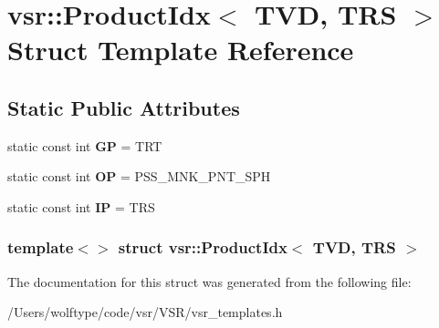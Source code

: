 \hypertarget{structvsr_1_1_product_idx_3_01_t_v_d_00_01_t_r_s_01_4}{\section{vsr\-:\-:Product\-Idx$<$ T\-V\-D, T\-R\-S $>$ Struct Template Reference}
\label{structvsr_1_1_product_idx_3_01_t_v_d_00_01_t_r_s_01_4}
}
\subsection*{Static Public Attributes}
\begin{DoxyCompactItemize}
\item 
\hypertarget{structvsr_1_1_product_idx_3_01_t_v_d_00_01_t_r_s_01_4_ab94c6a3ac8c3d6c0b10f03b42b774d46}{static const int {\bfseries G\-P} = T\-R\-T}\label{structvsr_1_1_product_idx_3_01_t_v_d_00_01_t_r_s_01_4_ab94c6a3ac8c3d6c0b10f03b42b774d46}

\item 
\hypertarget{structvsr_1_1_product_idx_3_01_t_v_d_00_01_t_r_s_01_4_ae53efde487f90c5f1f00a9c17213daa3}{static const int {\bfseries O\-P} = P\-S\-S\-\_\-\-M\-N\-K\-\_\-\-P\-N\-T\-\_\-\-S\-P\-H}\label{structvsr_1_1_product_idx_3_01_t_v_d_00_01_t_r_s_01_4_ae53efde487f90c5f1f00a9c17213daa3}

\item 
\hypertarget{structvsr_1_1_product_idx_3_01_t_v_d_00_01_t_r_s_01_4_a8f58976ceeb2ac12adf063c607ad2e9c}{static const int {\bfseries I\-P} = T\-R\-S}\label{structvsr_1_1_product_idx_3_01_t_v_d_00_01_t_r_s_01_4_a8f58976ceeb2ac12adf063c607ad2e9c}

\end{DoxyCompactItemize}
\subsubsection*{template$<$$>$ struct vsr\-::\-Product\-Idx$<$ T\-V\-D, T\-R\-S $>$}



The documentation for this struct was generated from the following file\-:\begin{DoxyCompactItemize}
\item 
/\-Users/wolftype/code/vsr/\-V\-S\-R/vsr\-\_\-templates.\-h\end{DoxyCompactItemize}
